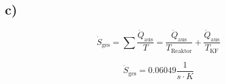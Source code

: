 

\subsection*{c)}

\[
\dot{S}_{\text{ges}} = \sum \frac{\dot{Q}_{\text{aus}}}{T} = \frac{\dot{Q}_{\text{aus}}}{T_{\text{Reaktor}}} + \frac{\dot{Q}_{\text{aus}}}{T_{\text{KF}}}
\]

\[
\dot{S}_{\text{ges}} = 0.06049 \frac{1}{s \cdot K}
\]